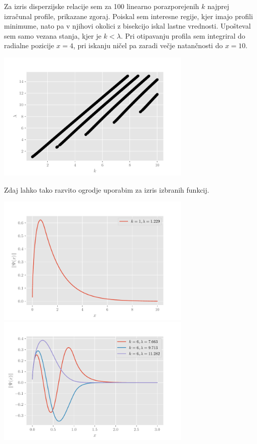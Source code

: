 \documentclass[a4paper,oneside,12pt]{article}
\begin{document}
Za izris disperzijske relacije sem za 100 linearno porazporejenih $k$ najprej izračunal profile, prikazane zgoraj. Poiskal sem interesne regije, kjer imajo profili minimume, nato pa v njihovi okolici z bisekcijo iskal lastne vrednosti. Upošteval sem samo vezana stanja, kjer je $k<\lambda$. Pri otipavanju profila sem integriral do radialne pozicije $x=4$, pri iskanju ničel pa zaradi večje natančnosti do $x=10$.
\begin{center}
     \includegraphics[width=0.7\textwidth]{../old/2021_disperzija.pdf}
\end{center}
Zdaj lahko tako razvito ogrodje uporabim za izris izbranih funkcij.
\begin{center}
     \includegraphics[width=0.7\textwidth]{../old/2021_funkcije1.pdf}
     \includegraphics[width=0.7\textwidth]{../old/2021_funkcije6.pdf}
\end{center}
\end{document}
